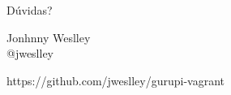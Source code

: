 \documentclass{beamer}
\begin{document}
\begin{frame}[plain,c]
  \begin{center}
    \Huge Dúvidas?
  \end{center}
\end{frame}

\begin{frame}
  \begin{center}
    \Huge Jonhnny Weslley \\ @jweslley
  \end{center}
  \begin{center}
    https://github.com/jweslley/gurupi-vagrant
  \end{center}
\end{frame}
\end{document}
